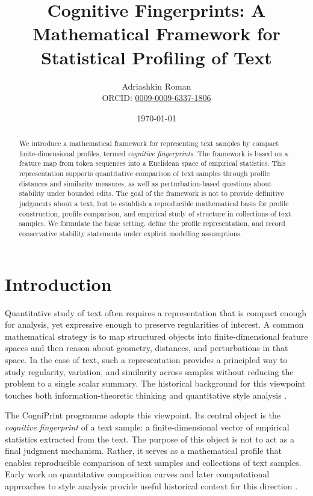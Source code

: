 \documentclass[11pt]{article}
\title{Cognitive Fingerprints: A Mathematical Framework for Statistical Profiling of Text}
\author{Adriashkin Roman\\\small ORCID: \href{https://orcid.org/0009-0009-6337-1806}{0009-0009-6337-1806}}
\date{\today}
\begin{document}
\maketitle

\begin{abstract}
We introduce a mathematical framework for representing text samples by compact finite-dimensional profiles, termed \emph{cognitive fingerprints}. The framework is based on a feature map from token sequences into a Euclidean space of empirical statistics. This representation supports quantitative comparison of text samples through profile distances and similarity measures, as well as perturbation-based questions about stability under bounded edits. The goal of the framework is not to provide definitive judgments about a text, but to establish a reproducible mathematical basis for profile construction, profile comparison, and empirical study of structure in collections of text samples. We formulate the basic setting, define the profile representation, and record conservative stability statements under explicit modelling assumptions.
\end{abstract}

\section{Introduction}

Quantitative study of text often requires a representation that is compact enough for analysis, yet expressive enough to preserve regularities of interest. A common mathematical strategy is to map structured objects into finite-dimensional feature spaces and then reason about geometry, distances, and perturbations in that space. In the case of text, such a representation provides a principled way to study regularity, variation, and similarity across samples without reducing the problem to a single scalar summary. The historical background for this viewpoint touches both information-theoretic thinking and quantitative style analysis \cite{Shannon1948,Holmes1998}.

The CogniPrint programme adopts this viewpoint. Its central object is the \emph{cognitive fingerprint} of a text sample: a finite-dimensional vector of empirical statistics extracted from the text. The purpose of this object is not to act as a final judgment mechanism. Rather, it serves as a mathematical profile that enables reproducible comparison of text samples and collections of text samples. Early work on quantitative composition curves and later computational approaches to style analysis provide useful historical context for this direction \cite{Mendenhall1887,Burrows1987,EderEtAl2016}.
\end{document}
